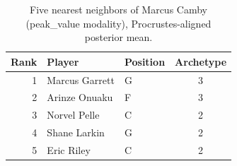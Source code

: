 \begin{table}[htbp]
  \centering\small
  \begin{tabular}{rllc}
    \toprule
    Rank & Player & Position & Archetype \\
    \midrule
    1 & Marcus Garrett & G & 3 \\
    2 & Arinze Onuaku & F & 3 \\
    3 & Norvel Pelle & C & 2 \\
    4 & Shane Larkin & G & 2 \\
    5 & Eric Riley & C & 2 \\
    \bottomrule
  \end{tabular}
  \caption{Five nearest neighbors of Marcus Camby (peak_value modality), Procrustes-aligned posterior mean.}
  \label{tab:Marcus_Camby_neighbors_peak_value}
\end{table}

